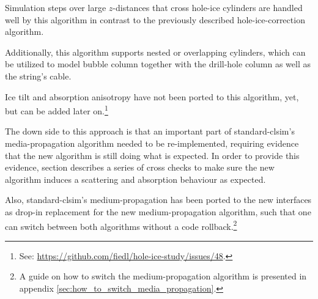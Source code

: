 Simulation steps over large $z$-distances that cross hole-ice cylinders are handled well by this algorithm in contrast to the previously described hole-ice-correction algorithm.

Additionally, this algorithm supports nested or overlapping cylinders, which can be utilized to model bubble column together with the drill-hole column as well as the string's cable.

Ice tilt and absorption anisotropy have not been ported to this algorithm, yet, but can be added later on.\footnote{See: \url{https://github.com/fiedl/hole-ice-study/issues/48}.}

The down side to this approach is that an important part of standard-clsim's media-propagation algorithm needed to be re-implemented, requiring evidence that the new algorithm is still doing what is expected. In order to provide this evidence, section  describes a series of cross checks to make sure the new algorithm induces a scattering and absorption behaviour as expected.

Also, standard-clsim's medium-propagation has been ported to the new interfaces as drop-in replacement for the new medium-propagation algorithm, such that one can switch between both algorithms without a code rollback.\footnote{A guide on how to switch the medium-propagation algorithm is presented in appendix \ref{sec:how_to_switch_media_propagation}.}

